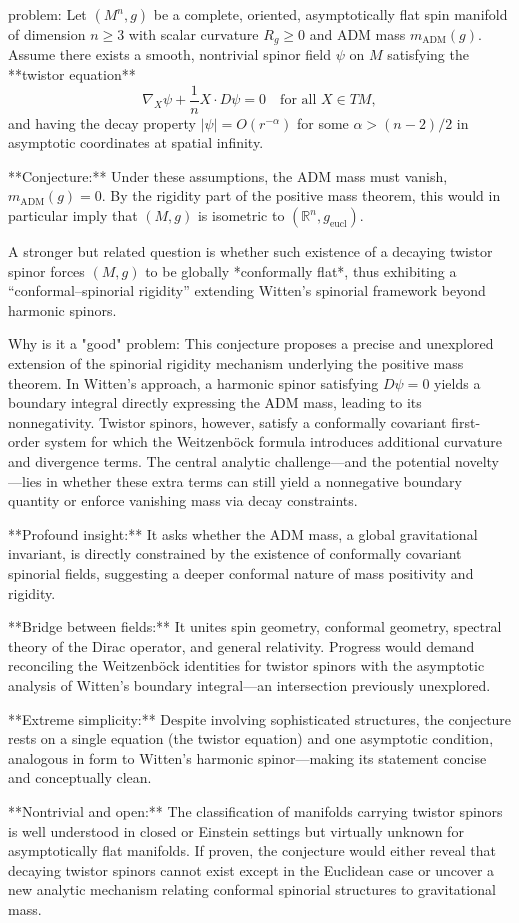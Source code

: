 problem:  
Let \((M^n,g)\) be a complete, oriented, asymptotically flat spin manifold of dimension \(n\ge 3\) with scalar curvature \(R_g\ge 0\) and ADM mass \(m_{\mathrm{ADM}}(g)\).  
Assume there exists a smooth, nontrivial spinor field \(\psi\) on \(M\) satisfying the **twistor equation**
\[
\nabla_X \psi + \frac{1}{n} X \cdot D\psi = 0 \quad \text{for all } X\in TM,
\]
and having the decay property \(|\psi| = O(r^{-\alpha})\) for some \(\alpha > (n-2)/2\) in asymptotic coordinates at spatial infinity.  

**Conjecture:**  
Under these assumptions, the ADM mass must vanish, \(m_{\mathrm{ADM}}(g)=0.\)  
By the rigidity part of the positive mass theorem, this would in particular imply that \((M,g)\) is isometric to \((\mathbb{R}^n,g_{\mathrm{eucl}})\).  

A stronger but related question is whether such existence of a decaying twistor spinor forces \((M,g)\) to be globally *conformally flat*, thus exhibiting a “conformal–spinorial rigidity” extending Witten’s spinorial framework beyond harmonic spinors.

Why is it a "good" problem:  
This conjecture proposes a precise and unexplored extension of the spinorial rigidity mechanism underlying the positive mass theorem. In Witten’s approach, a harmonic spinor satisfying \(D\psi = 0\) yields a boundary integral directly expressing the ADM mass, leading to its nonnegativity. Twistor spinors, however, satisfy a conformally covariant first-order system for which the Weitzenböck formula introduces additional curvature and divergence terms. The central analytic challenge—and the potential novelty—lies in whether these extra terms can still yield a nonnegative boundary quantity or enforce vanishing mass via decay constraints.  

**Profound insight:**  
It asks whether the ADM mass, a global gravitational invariant, is directly constrained by the existence of conformally covariant spinorial fields, suggesting a deeper conformal nature of mass positivity and rigidity.  

**Bridge between fields:**  
It unites spin geometry, conformal geometry, spectral theory of the Dirac operator, and general relativity. Progress would demand reconciling the Weitzenböck identities for twistor spinors with the asymptotic analysis of Witten’s boundary integral—an intersection previously unexplored.  

**Extreme simplicity:**  
Despite involving sophisticated structures, the conjecture rests on a single equation (the twistor equation) and one asymptotic condition, analogous in form to Witten’s harmonic spinor—making its statement concise and conceptually clean.  

**Nontrivial and open:**  
The classification of manifolds carrying twistor spinors is well understood in closed or Einstein settings but virtually unknown for asymptotically flat manifolds. If proven, the conjecture would either reveal that decaying twistor spinors cannot exist except in the Euclidean case or uncover a new analytic mechanism relating conformal spinorial structures to gravitational mass.